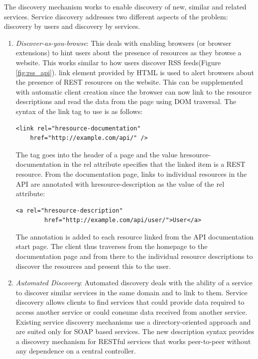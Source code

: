 \begin{spacing}{1.5}
The discovery mechanism works to enable discovery of new, similar and related services. Service discovery addresses two different aspects of the problem: discovery by users and discovery by services.
\begin{enumerate}
\item {\it Discover-as-you-browse}: This deals with enabling browsers (or browser extensions) to hint users about the presence of resources as they browse a website. This works similar to how users discover RSS feeds(Figure \ref{fig:rss_api}). link element provided by HTML is used to alert browsers about the presence of REST resources on the website. This can be supplemented with automatic client creation since the browser can now link to the resource descriptions and read the data from the page using DOM traversal. The syntax of the link tag to use is as follows:

\begin{verbatim}
<link rel="hresource-documentation"
    href="http://example.com/api/" />
\end{verbatim}


The tag goes into the header of a page and the value hresource-documentation in the rel attribute specifies that the linked item is a REST resource. From the documentation page, links to individual resources in the API are annotated with hresource-description as the value of the rel attribute:

\begin{verbatim}
<a rel="hresource-description"
        href="http://example.com/api/user/">User</a>
\end{verbatim}

The annotation is added to each resource linked from the API documentation start page. The client thus traverses from the homepage to the documentation page and from there to the individual resource descriptions to discover the resources and present this to the user.

\item {\it Automated Discovery}: Automated discovery deals with the ability of a service to discover similar services in the same domain and to link to them. Service discovery allows clients to find services that could provide data required to access another service or could consume data received from another service. Existing service discovery mechanisms use a directory-oriented approach and are suited only for SOAP based services. The new description syntax provides a discovery mechanism for RESTful services that works peer-to-peer without any dependence on a central controller.


\end{enumerate}
\end{spacing}
